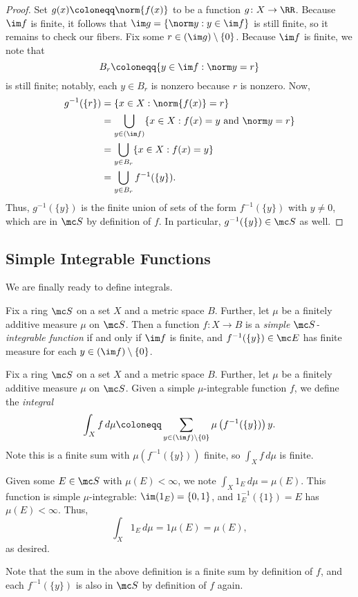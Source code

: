 \documentclass[../notes.tex]{subfiles}
\begin{document}
\begin{proof}
	Set $g(x)\coloneqq\norm{f(x)}$ to be a function $g\colon X\to\RR$. Because $\im f$ is finite, it follows that $\im g=\{\norm y:y\in\im f\}$ is still finite, so it remains to check our fibers. Fix some $r\in(\im g)\setminus\{0\}$. Because $\im f$ is finite, we note that
	\[B_r\coloneqq\{y\in\im f:\norm y=r\}\]
	is still finite; notably, each $y\in B_r$ is nonzero because $r$ is nonzero. Now,
	\begin{align*}
		g^{-1}(\{r\}) &= \{x\in X:\norm{f(x)}=r\} \\
		&= \bigcup_{y\in(\im f)}\{x\in X:f(x)=y\text{ and }\norm y=r\} \\
		&= \bigcup_{y\in B_r}\{x\in X:f(x)=y\} \\
		&= \bigcup_{y\in B_r}f^{-1}(\{y\}).
	\end{align*}
	Thus, $g^{-1}(\{y\})$ is the finite union of sets of the form $f^{-1}(\{y\})$ with $y\ne0$, which are in $\mc S$ by definition of $f$. In particular, $g^{-1}(\{y\})\in\mc S$ as well.
\end{proof}

\subsection{Simple Integrable Functions}
We are finally ready to define integrals.
\begin{definition}
	Fix a ring $\mc S$ on a set $X$ and a metric space $B$. Further, let $\mu$ be a finitely additive measure $\mu$ on $\mc S$. Then a function $f\colon X\to B$ is a \textit{simple $\mc S$-integrable function} if and only if $\im f$ is finite, and $f^{-1}(\{y\})\in\mc E$ has finite measure for each $y\in(\im f)\setminus\{0\}$.
\end{definition}
\begin{definition}[Integral]
	Fix a ring $\mc S$ on a set $X$ and a metric space $B$. Further, let $\mu$ be a finitely additive measure $\mu$ on $\mc S$. Given a simple $\mu$-integrable function $f$, we define the \textit{integral}
	\[\int_Xf\,d\mu\coloneqq\sum_{y\in(\im f)\setminus\{0\}}\mu\left(f^{-1}(\{y\})\right)y.\]
	Note this is a finite sum with $\mu\left(f^{-1}(\{y\})\right)$ finite, so $\int_Xf\,d\mu$ is finite.
\end{definition}
\begin{example} \label{ex:integrate-indicator}
	Given some $E\in\mc S$ with $\mu(E)<\infty$, we note $\int_X1_E\,d\mu=\mu(E)$. This function is simple $\mu$-integrable: $\im(1_E)=\{0,1\}$, and $1_E^{-1}(\{1\})=E$ has $\mu(E)<\infty$. Thus,
	\[\int_X1_E\,d\mu=1\mu(E)=\mu(E),\]
	as desired.
\end{example}
Note that the sum in the above definition is a finite sum by definition of $f$, and each $f^{-1}(\{y\})$ is also in $\mc S$ by definition of $f$ again.
\end{document}
